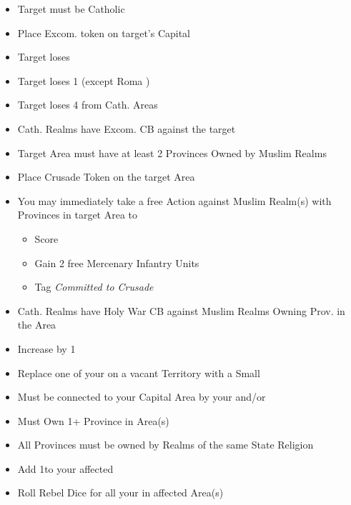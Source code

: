 \documentclass[10pt]{article}
\begin{document}
\begin{itemize}
	\item Target must be Catholic
	\item Place Excom. token on target's Capital
	\item Target loses 
	\item Target loses 1 \cardinal (except Roma \cardinal)
	\item Target loses 4 \influence from Cath. Areas
	\item Cath. Realms have Excom. CB against the target
\end{itemize}

\begin{itemize}
	\item Target Area must have at least 2 Provinces Owned by Muslim Realms
	\item Place Crusade Token on the target Area
	\item You may immediately take a free  Action against Muslim Realm(s) with Provinces in target Area to
	\begin{itemize}
		\item Score 
		\item Gain 2 free Mercenary Infantry Units
		\item Tag \emph{Committed to Crusade}
	\end{itemize}
	\item Cath. Realms have Holy War CB against Muslim Realms Owning Prov. in the Area	
\end{itemize}

\begin{itemize}
	\item Increase \stability by 1
\end{itemize}

\begin{itemize}
	\item Replace one of your \claims on a vacant Territory with a Small \town
	\item Must be connected to your Capital Area by your \towns and/or \ships
\end{itemize}

\begin{itemize}
	\item Must Own 1+ Province in Area(s)
	\item All Provinces must be owned by Realms of the same State Religion
	\item Add 1\unrest to your affected \towns
	\item Roll Rebel Dice for all your \unrest in affected Area(s)
\end{itemize}
\end{document}
